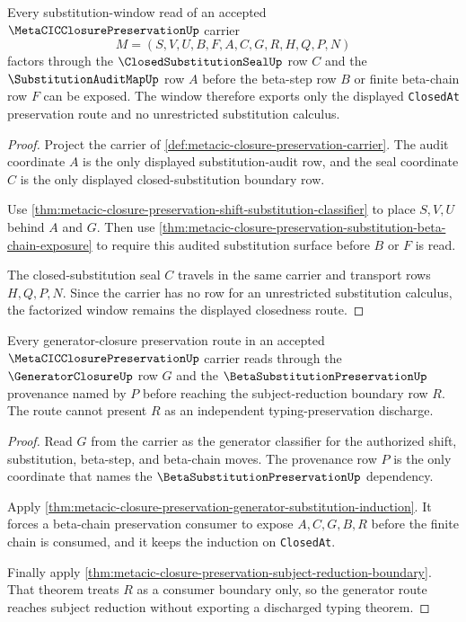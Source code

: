 \begin{theorem}
\label{thm:metacic-closure-preservation-substitution-window}
Every substitution-window read of an accepted $\MetaCICClosurePreservationUp$ carrier
$$
M=(S,V,U,B,F,A,C,G,R,H,Q,P,N)
$$
factors through the $\ClosedSubstitutionSealUp$ row $C$ and the $\SubstitutionAuditMapUp$ row $A$ before the beta-step row $B$ or finite beta-chain row $F$ can be exposed. The window therefore exports only the displayed \texttt{ClosedAt} preservation route and no unrestricted substitution calculus.
\end{theorem}
\begin{proof}
Project the carrier of \autoref{def:metacic-closure-preservation-carrier}. The audit coordinate $A$ is the only displayed substitution-audit row, and the seal coordinate $C$ is the only displayed closed-substitution boundary row.

Use \autoref{thm:metacic-closure-preservation-shift-substitution-classifier} to place $S,V,U$ behind $A$ and $G$. Then use \autoref{thm:metacic-closure-preservation-substitution-beta-chain-exposure} to require this audited substitution surface before $B$ or $F$ is read.

The closed-substitution seal $C$ travels in the same carrier and transport rows $H,Q,P,N$. Since the carrier has no row for an unrestricted substitution calculus, the factorized window remains the displayed closedness route.
\end{proof}

\begin{theorem}
\label{thm:metacic-closure-preservation-generator-route}
Every generator-closure preservation route in an accepted $\MetaCICClosurePreservationUp$ carrier reads through the $\GeneratorClosureUp$ row $G$ and the $\BetaSubstitutionPreservationUp$ provenance named by $P$ before reaching the subject-reduction boundary row $R$. The route cannot present $R$ as an independent typing-preservation discharge.
\end{theorem}
\begin{proof}
Read $G$ from the carrier as the generator classifier for the authorized shift, substitution, beta-step, and beta-chain moves. The provenance row $P$ is the only coordinate that names the $\BetaSubstitutionPreservationUp$ dependency.

Apply \autoref{thm:metacic-closure-preservation-generator-substitution-induction}. It forces a beta-chain preservation consumer to expose $A,C,G,B,R$ before the finite chain is consumed, and it keeps the induction on \texttt{ClosedAt}.

Finally apply \autoref{thm:metacic-closure-preservation-subject-reduction-boundary}. That theorem treats $R$ as a consumer boundary only, so the generator route reaches subject reduction without exporting a discharged typing theorem.
\end{proof}

